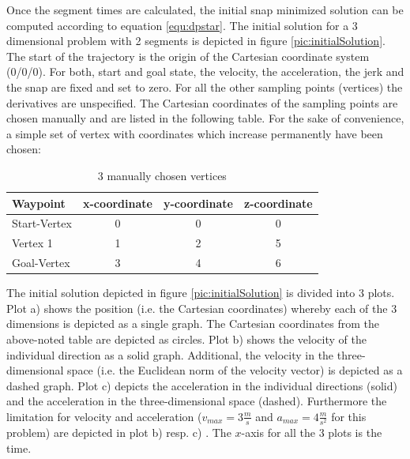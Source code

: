 Once the segment times are calculated, the initial snap minimized solution can be computed according to equation \ref{equ:dpstar}. The initial solution for a 3 dimensional problem with 2 segments is depicted in figure \ref{pic:initialSolution}. The start of the trajectory is the origin of the Cartesian coordinate system (0/0/0). For both, start and goal state, the velocity, the acceleration, the jerk and the snap are fixed and set to zero. For all the other sampling points (vertices) the derivatives are unspecified. The Cartesian coordinates of the sampling points are chosen manually and are listed in the following table.  For the sake of convenience, a simple set of vertex with coordinates which increase permanently have been chosen:

\begin{table}[H] 
\begin{center}
    \begin{tabular}{ | l | c | c | c |}
    \hline
    Waypoint & x-coordinate & y-coordinate & z-coordinate\\ \hline
    Start-Vertex & 0 & 0 & 0 \\ \hline
    Vertex 1 & 1 & 2 & 5\\ \hline
    Goal-Vertex & 3 & 4 & 6\\
    \hline
    \end{tabular}
    \caption{3 manually chosen  vertices}
    \label{tab:vertices}
\end{center}
\end{table}


The initial solution depicted in figure \ref{pic:initialSolution} is divided into 3 plots. Plot a) shows the position (i.e. the Cartesian coordinates) whereby each of the 3 dimensions is depicted as a single graph. The Cartesian coordinates from the above-noted table are depicted as circles. 
Plot b) shows the velocity of the individual direction as a solid graph. Additional, the velocity in the three-dimensional space (i.e. the Euclidean norm of the velocity vector) is depicted as a dashed graph.
Plot c) depicts the acceleration in the individual directions (solid) and the acceleration in the three-dimensional space (dashed). Furthermore the limitation for velocity and acceleration ($v_{max} = 3 \frac{m}{s}$ and $a_{max} = 4 \frac{m}{s^2}$ for this problem) are depicted in plot b) resp. c) . The $x$-axis for all the 3 plots is the time. \newline


